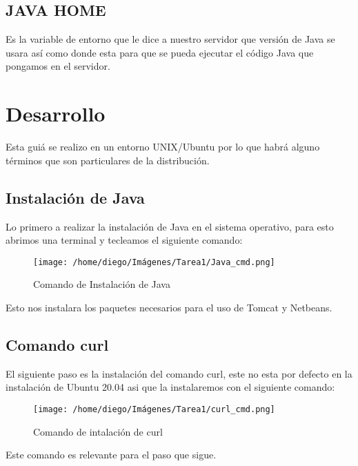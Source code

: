 \documentclass{article}
\begin{document}
		\subsection{JAVA HOME}
			Es la variable de entorno que le dice a nuestro servidor que versión de Java se usara así como donde esta para que se pueda ejecutar el código Java que pongamos en el servidor.
	\section{Desarrollo}
		Esta guiá se realizo en un entorno UNIX/Ubuntu por lo que habrá alguno términos que son particulares de la distribución.
		\subsection{Instalación de Java}
		Lo primero a realizar la instalación de Java en el sistema operativo, para esto abrimos una terminal y tecleamos el siguiente comando:
		\begin{figure}[h]
			\centering
			\texttt{[image: /home/diego/Imágenes/Tarea1/Java\_cmd.png]}
			\caption{Comando de Instalación de Java}
		\end{figure}
		Esto nos instalara los paquetes necesarios para el uso de Tomcat y Netbeans.
		\subsection{Comando curl}
		El siguiente paso es la instalación del comando curl, este no esta por defecto en la instalación de Ubuntu 20.04 asi que la instalaremos con el siguiente comando:
		\begin{figure}[h]
			\centering
			\texttt{[image: /home/diego/Imágenes/Tarea1/curl\_cmd.png]}
			\caption{Comando de intalación de curl}
		\end{figure}
		Este comando es relevante para el paso que sigue.
\end{document}
